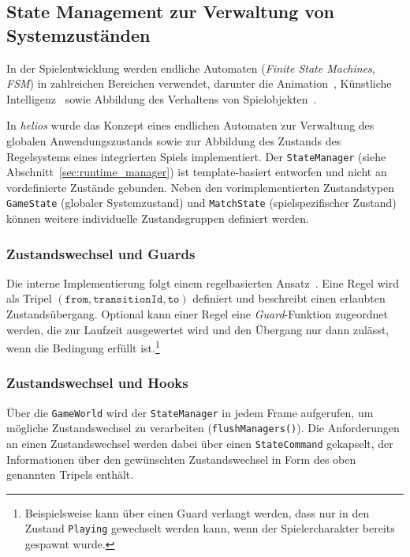 \subsection{State Management zur Verwaltung von Systemzuständen}\label{sec:state_management}

In der Spielentwicklung werden endliche Automaten (\textit{Finite State Machines}, \textit{FSM}) in zahlreichen Bereichen verwendet, darunter die Animation~\cite[S. 786-805]{Gre19}, Künstliche Intelligenz~\cite[S. 62-64]{YT25} sowie Abbildung des Verhaltens von Spielobjekten~\cite[S. 87-104]{Nys14}.

In \textit{helios} wurde das Konzept eines endlichen Automaten zur Verwaltung des globalen Anwendungszustands sowie zur Abbildung des Zustands des Regelsystems eines integrierten Spiels implementiert.
Der \texttt{StateManager} (siehe Abschnitt~\ref{sec:runtime_manager}) ist template-basiert entworfen und nicht an vordefinierte Zustände gebunden.
Neben den vorimplementierten Zustandstypen \texttt{GameState} (globaler Systemzustand) und \texttt{MatchState} (spielspezifischer Zustand) können weitere individuelle Zustandsgruppen definiert werden.

\subsubsection{Zustandswechsel und Guards}

Die interne Implementierung folgt einem regelbasierten Ansatz~\cite{Har87}.
Eine Regel wird als Tripel $(\texttt{from}, \texttt{transitionId}, \texttt{to})$ definiert und beschreibt einen erlaubten Zustandsübergang.
Optional kann einer Regel eine \textit{Guard}-Funktion zugeordnet werden, die zur Laufzeit ausgewertet wird und den Übergang nur dann zulässt, wenn die Bedingung erfüllt ist.\footnote{
    Beispielsweise kann über einen Guard verlangt werden, dass nur in den Zustand \texttt{Playing} gewechselt werden kann, wenn der Spielercharakter bereits gespawnt wurde.
}

\subsubsection{Zustandswechsel und Hooks}

Über die \texttt{GameWorld} wird der \texttt{StateManager} in jedem Frame aufgerufen, um mögliche Zustandswechsel zu verarbeiten (\texttt{flushManagers()}).
Die Anforderungen an einen Zustandswechsel werden dabei über einen \texttt{StateCommand} gekapselt, der Informationen über den gewünschten Zustandswechsel in Form des oben genannten Tripels enthält.

